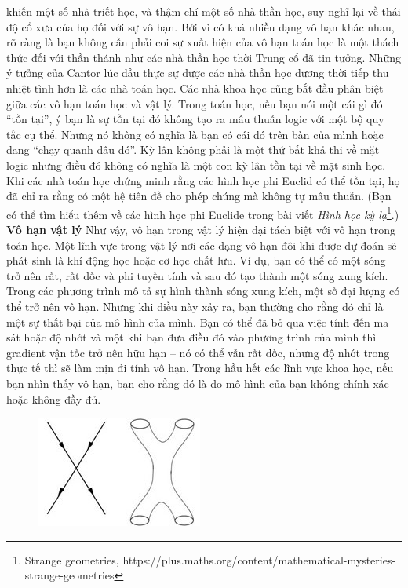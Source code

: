 \begin{multicols}{2}
	khiến một số nhà triết học, và thậm chí một số nhà thần học, suy nghĩ lại về
	thái độ cổ xưa của họ đối với sự vô hạn. Bởi vì có khá nhiều dạng vô hạn khác
	nhau, rõ ràng là bạn không cần phải coi sự xuất hiện của vô hạn toán học là
	một thách thức đối với thần thánh như các nhà thần học thời Trung cổ đã tin
	tưởng. Những ý tưởng của Cantor lúc đầu thực sự được các nhà thần học đương
	thời tiếp thu nhiệt tình hơn là các nhà toán học.
	\vskip 0.05cm
	Các nhà khoa học cũng bắt đầu phân biệt giữa các vô hạn toán học và vật lý.
	Trong toán học, nếu bạn nói một cái gì đó ``tồn tại'', ý bạn là sự tồn tại đó
	không tạo ra mâu thuẫn logic với một bộ quy tắc cụ thể. Nhưng nó không có
	nghĩa là bạn có cái đó trên bàn của mình hoặc đang ``chạy quanh đâu đó''. Kỳ lân
	không phải là một thứ bất khả thi về mặt logic nhưng điều đó không có nghĩa
	là một con kỳ lân tồn tại về mặt sinh học. Khi các nhà toán học chứng minh
	rằng các hình học phi Euclid có thể tồn tại, họ đã chỉ ra rằng có một hệ tiên
	đề cho phép chúng mà không tự mâu thuẫn. (Bạn có thể tìm hiểu thêm về các hình
	học phi Euclide trong bài viết \textit{Hình học kỳ lạ}\footnote{\color{quantoan}Strange geometries,
		https://plus.maths.org/content/mathematical-mysteries-strange-geometries}.)
	\vskip 0.05cm
	\textbf{\color{quantoan}Vô hạn vật lý}
	\vskip 0.05cm 
	Như vậy, vô hạn trong vật lý hiện đại tách biệt với vô hạn trong toán học. Một
	lĩnh vực trong vật lý nơi các dạng vô hạn đôi khi được dự đoán sẽ phát sinh là
	khí động học hoặc cơ học chất lưu. Ví dụ, bạn có thể có một sóng trở nên
	rất, rất dốc và phi tuyến tính và sau đó tạo thành một sóng xung kích. Trong các
	phương trình mô tả sự hình thành sóng xung kích, một số đại lượng có thể trở
	nên vô hạn. Nhưng khi điều này xảy ra, bạn thường cho rằng đó chỉ là một sự
	thất bại của mô hình của mình. Bạn có thể đã bỏ qua việc tính đến ma sát hoặc
	độ nhớt và một khi bạn đưa điều đó vào phương trình của mình thì gradient vận
	tốc trở nên hữu hạn -- nó có thể vẫn rất dốc, nhưng độ nhớt trong thực tế thì
	sẽ làm mịn đi tính vô hạn. Trong hầu hết các lĩnh vực khoa học, nếu bạn nhìn
	thấy vô hạn, bạn cho rằng đó là do mô hình của bạn không chính xác hoặc không
	đầy đủ.
	\begin{figure}[H]
		\centering
		\vspace*{-5pt}
		\captionsetup{labelformat= empty, justification=centering}
		\includegraphics[width=0.75\linewidth]{1}

\end{figure}
\end{multicols}
